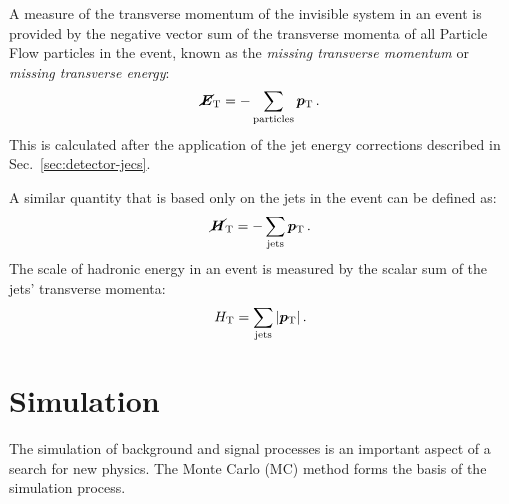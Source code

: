 A measure of the transverse momentum of the invisible system in an event is 
provided by the negative vector sum of the transverse momenta of all Particle 
Flow particles in the event, known as the \textit{missing transverse momentum} 
or \textit{missing transverse energy}:
\begin{equation}
\bm{\cancel{E}}_\mathrm{T} = - \sum_{\mathrm{particles}} \bm{p}_\mathrm{T} \, .
\end{equation}
This is calculated after the application of the jet energy corrections 
described in Sec.~\ref{sec:detector-jecs}.

A similar quantity that is based only on the jets in the event can be defined 
as:
\begin{equation}
\bm{\cancel{H}}_\mathrm{T} = - \sum_{\mathrm{jets}} \bm{p}_\mathrm{T} \, .
\end{equation}
The scale of hadronic energy in an event is measured by the scalar sum of the 
jets' transverse momenta:
\begin{equation}
\mbox{$H_\text{T}$} = \sum_{\mathrm{jets}} |\bm{p}_\mathrm{T}| \, .
\end{equation}

\section{Simulation}
\label{sec:detector-simulation}

The simulation of background and signal processes is an important aspect of a 
search for new physics. The Monte Carlo (MC) method forms the basis of the 
simulation process.

